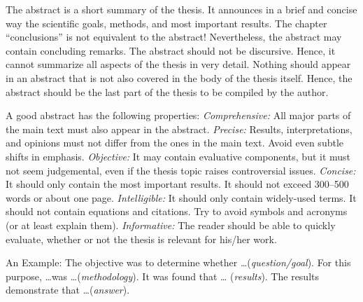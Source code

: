 \documentclass[a4paper, 11pt, oneside]{Thesis}  %
\begin{document}
The abstract is a short summary of the thesis. It announces in
a brief and concise way the scientific goals, methods, and most important
results. The chapter ``conclusions'' is not equivalent to the abstract!
Nevertheless, the abstract may contain concluding remarks. The abstract
should not be discursive. Hence, it cannot summarize all aspects of the thesis
in very detail. Nothing should appear in an abstract that is not also
covered in the body of the thesis itself. Hence, the abstract should be the
last part of the thesis to be compiled by the author.

A good abstract has the following properties: \emph{Comprehensive:} All major
parts of the main text must also appear in the abstract. \emph{Precise:}
Results, interpretations, and opinions must not differ from the ones in the main
text. Avoid even subtle shifts in emphasis. \emph{Objective:} It may contain
evaluative components, but it must not seem judgemental, even if the thesis
topic raises controversial issues. \emph{Concise:} It should only contain the
most important results. It should not exceed 300--500 words or about one page.
\emph{Intelligible:} It should only contain widely-used terms. It should
not contain equations and citations. Try to avoid symbols and acronyms (or at
least explain them). \emph{Informative:} The reader should be able to quickly
evaluate, whether or not the thesis is relevant for his/her work.

An Example: The objective was to determine whether \dots (\emph{question/goal}).
For this purpose, \dots was \dots (\emph{methodology}). It was found that \dots
(\emph{results}). The results demonstrate that \dots (\emph{answer}).

\clearpage  %


\clearpage  %

\pagestyle{fancy}  %
\end{document}
